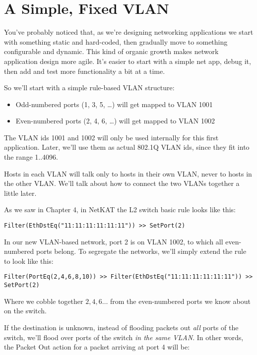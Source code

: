 \section{A Simple, Fixed VLAN}

You've probably noticed that, as we're designing networking applications we start with something 
static and hard-coded, then gradually move to something configurable and dynamic.  This kind of 
organic growth makes network application design more agile.
It's easier to start with a simple net app, debug it, then add and test more functionality a bit at a time.  

So we'll start with a simple rule-based VLAN structure:

\begin{itemize}
\item Odd-numbered ports (1, 3, 5, \ldots) will get mapped to VLAN 1001
\item Even-numbered ports (2, 4, 6, \ldots) will get mapped to VLAN 1002
\end{itemize}

The VLAN ids 1001 and 1002 will only be used internally for this first application.  Later, we'll use
them as actual 802.1Q VLAN ids, since they fit into the range 1..4096.  

Hosts in each VLAN will talk only to hosts in their own VLAN, never to hosts in the other VLAN.  We'll talk
about how to connect the two VLANs together a little later.  

As we saw in Chapter 4, in NetKAT the L2 switch basic rule looks like this:

\begin{verbatim}
Filter(EthDstEq("11:11:11:11:11:11")) >> SetPort(2)
\end{verbatim}

In our new VLAN-based network, port 2 is on VLAN 1002, to which all even-numbered ports belong.  
To segregate the networks, we'll simply extend the rule to look like this:

\begin{verbatim}
Filter(PortEq(2,4,6,8,10)) >> Filter(EthDstEq("11:11:11:11:11:11")) >> SetPort(2)
\end{verbatim}

Where we cobble together $2, 4, 6\ldots$ from the even-numbered ports we know about on the switch.  

If the destination is unknown, instead of flooding packets out \emph{all} ports of the switch, 
we'll flood over ports of the switch \emph{in the same VLAN}.  In other words, the Packet Out action 
for a packet arriving at port 4 will be:

